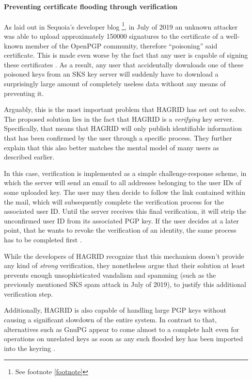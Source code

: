 \paragraph{Preventing certificate flooding through verification}
As laid out in Sequoia's developer blog \footnote{See footnote \ref{footnote}}, in July of 2019 an unknown attacker was able to upload approximately 150000 signatures to the certificate of a well-known member of the OpenPGP community, therefore ``poisoning'' said certificate. This is made even worse by the fact that any user is capable of signing these certificates \cite{CVE_2019}. As a result, any user that accidentally downloads one of these poisoned keys from an SKS key server will suddenly have to download a surprisingly large amount of completely useless data without any means of preventing it.

Arguably, this is the most important problem that HAGRID has set out to solve. The proposed solution lies in the fact that HAGRID is a \emph{verifying} key server. Specifically, that means that HAGRID will only publish identifiable information that has been confirmed by the user through a specific process. They further explain that this also better matches the mental model of many users as described earlier.

In this case, verification is implemented as a simple challenge-response scheme, in which the server will send an email to all addresses belonging to the user IDs of some uploaded key. The user may then decide to follow the link contained within the mail, which will subsequently complete the verification process for the associated user ID.
Until the server receives this final verification, it will strip the unconfirmed user ID from its associated PGP key. If the user decides at a later point, that he wants to revoke the verification of an identity, the same process has to be completed first \cite{sequoia_blog}.

While the developers of HAGRID recognize that this mechanism doesn't provide any kind of \emph{strong} verification, they nonetheless argue that their solution at least prevents enough unsophisticated vandalism and spamming (such as the previously mentioned SKS spam attack in July of 2019), to justify this additional verification step.

Additionally, HAGRID is also capable of handling large PGP keys without causing a significant slowdown of the entire system. In contrast to that, alternatives such as GnuPG appear to come almost to a complete halt even for operations on unrelated keys as soon as any such flooded key has been imported into the keyring \cite{flooding_blog}. 
